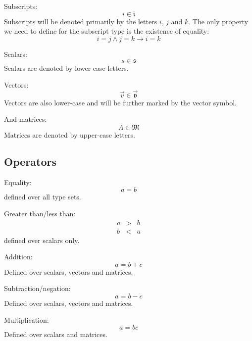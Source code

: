 \documentclass{article}
\newcommand{\subclass}{\mathfrak{i}}
\newcommand{\scalarclass}{\mathfrak{s}}
\newcommand{\vectorclass}{\vec{\mathfrak{v}}}
\newcommand{\matrixclass}{\mathfrak{M}}
\begin{document}
Subscripts:
\begin{equation}
i \in \subclass
\end{equation}
Subscripts will be denoted primarily by the letters $i$, $j$ and $k$.
The only property we need to define for the subscript type is the existence
of equality:
\begin{equation}
	i = j \land j = k \rightarrow i = k
\end{equation}

Scalars:
\begin{equation}
	s \in \scalarclass
\end{equation}
Scalars are denoted by lower case letters.

Vectors:
\begin{equation}
	\vec v \in \vectorclass
	\label{vectormembership}
\end{equation}
Vectors are also lower-case and will be further marked by the vector symbol.

And matrices:
\begin{equation}
	A \in \matrixclass
	\label{matrixmembership}
\end{equation}
Matrices are denoted by upper-case letters.

\subsection{Operators}

Equality:
\begin{equation}
	a=b
\end{equation}
defined over all type sets.

Greater than/less than:
\begin{eqnarray}
	a & > & b \\
	b & < & a
\end{eqnarray}
defined over scalars only.

Addition:
\begin{equation}
	a = b+c
\end{equation}
Defined over scalars, vectors and matrices.

Subtraction/negation:
\begin{equation}
	a = b - c
\end{equation}
Defined over scalars, vectors and matrices.

Multiplication:
\begin{equation}
	a = b c
\end{equation}
Defined over scalars and matrices.
\end{document}
